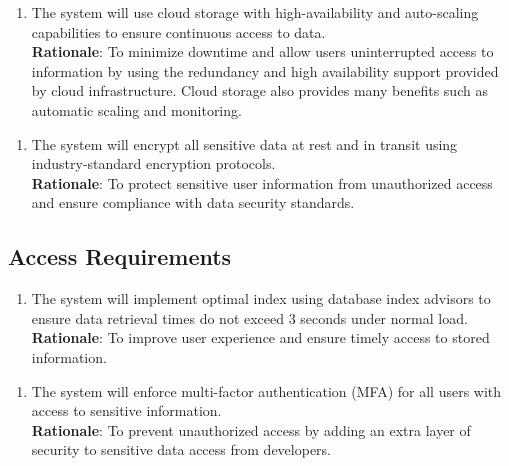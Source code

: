 \documentclass[12pt, titlepage]{article}
\begin{document}
\begin{enumerate}[{SR}8. ]
    \item The system will use cloud storage with high-availability and auto-scaling capabilities to ensure continuous access to data.\\
    \textbf{Rationale}: To minimize downtime and allow users uninterrupted access to information by using the redundancy and high availability support provided by cloud infrastructure. Cloud storage also provides many benefits such as automatic scaling and monitoring. 
\end{enumerate} 
\begin{enumerate}[{SR}9. ]
    \item The system will encrypt all sensitive data at rest and in transit using industry-standard encryption protocols.\\
    \textbf{Rationale}: To protect sensitive user information from unauthorized access and ensure compliance with data security standards.
\end{enumerate}

\subsection{Access Requirements}
\begin{enumerate}[{AR}1. ]
    \item The system will implement optimal index using database index advisors to ensure data retrieval times do not exceed 3 seconds under normal load.\\
    \textbf{Rationale}: To improve user experience and ensure timely access to stored information.
\end{enumerate} 
\begin{enumerate}[{AR}2. ]
    \item The system will enforce multi-factor authentication (MFA) for all users with access to sensitive information. \\
    \textbf{Rationale}: To prevent unauthorized access by adding an extra layer of security to sensitive data access from developers.
\end{enumerate} 
\end{document}
